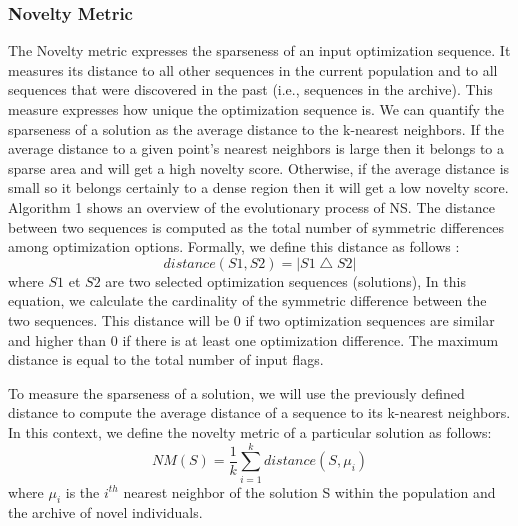 \subsubsection{Novelty Metric}
The Novelty metric expresses the sparseness of an input optimization sequence. It measures its distance to all other sequences in the current population and to all sequences that were discovered in the past (i.e., sequences in the archive).
This measure expresses how unique the optimization sequence is. We can
quantify the sparseness of a solution as the average
distance to the k-nearest neighbors. If the average distance to
a given point's nearest neighbors is large then it belongs to
a sparse area and will get a high novelty score. Otherwise,
if the average distance is small so it belongs certainly to
a dense region then it will get a low novelty score. Algorithm 1 shows an overview of the evolutionary process of NS. The distance between two sequences is computed as the total number of symmetric differences among optimization options. Formally, we define this distance as follows :
\begin{equation}
distance(S1,S2)=\left | S1 \bigtriangleup S2 \right |
\end{equation}
where $S1$ et $S2$ are two selected optimization sequences (solutions), In this equation, we calculate the cardinality of the symmetric difference between the two sequences. This distance will be 0 if two optimization sequences are similar and higher than 0 if there is at least one optimization difference. The maximum distance is equal to the total number of input flags.

To measure the sparseness of a solution, we will use the previously defined distance to compute the average distance of a sequence to its k-nearest neighbors. In this context, we define the novelty metric of a particular solution as follows:
\begin{equation}
NM(S) = \frac{1}{k} \sum_{i=1}^{k} distance(S,\mu _{i})
\end{equation}
where $\mu _{i}$ is the $i^{th}$ nearest neighbor of the solution S within the population and the archive of novel individuals.